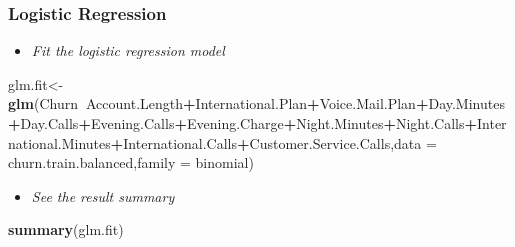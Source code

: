 \documentclass[]{article}
\newenvironment{Shaded}{\begin{snugshade}}{\end{snugshade}}
\newcommand{\DataTypeTok}[1]{\textcolor[rgb]{0.13,0.29,0.53}{#1}}
\newcommand{\KeywordTok}[1]{\textcolor[rgb]{0.13,0.29,0.53}{\textbf{#1}}}
\newcommand{\NormalTok}[1]{#1}
\newcommand{\OperatorTok}[1]{\textcolor[rgb]{0.81,0.36,0.00}{\textbf{#1}}}
\providecommand{\tightlist}{%
  \setlength{\itemsep}{0pt}\setlength{\parskip}{0pt}}
\begin{document}
\hypertarget{logistic-regression}{%
\subsubsection{Logistic Regression}\label{logistic-regression}}

\begin{itemize}
\tightlist
\item
  \emph{Fit the logistic regression model}
\end{itemize}

\begin{Shaded}
\begin{Highlighting}[]
\NormalTok{glm.fit<-}\KeywordTok{glm}\NormalTok{(Churn}\OperatorTok{~}\NormalTok{Account.Length}\OperatorTok{+}\NormalTok{International.Plan}\OperatorTok{+}\NormalTok{Voice.Mail.Plan}\OperatorTok{+}\NormalTok{Day.Minutes}\OperatorTok{+}\NormalTok{Day.Calls}\OperatorTok{+}\NormalTok{Evening.Calls}\OperatorTok{+}\NormalTok{Evening.Charge}\OperatorTok{+}\NormalTok{Night.Minutes}\OperatorTok{+}\NormalTok{Night.Calls}\OperatorTok{+}\NormalTok{International.Minutes}\OperatorTok{+}\NormalTok{International.Calls}\OperatorTok{+}\NormalTok{Customer.Service.Calls,}\DataTypeTok{data =}\NormalTok{ churn.train.balanced,}\DataTypeTok{family =}\NormalTok{ binomial)}
\end{Highlighting}
\end{Shaded}

\begin{itemize}
\tightlist
\item
  \emph{See the result summary}
\end{itemize}

\begin{Shaded}
\begin{Highlighting}[]
\KeywordTok{summary}\NormalTok{(glm.fit)}
\end{Highlighting}
\end{Shaded}
\end{document}
